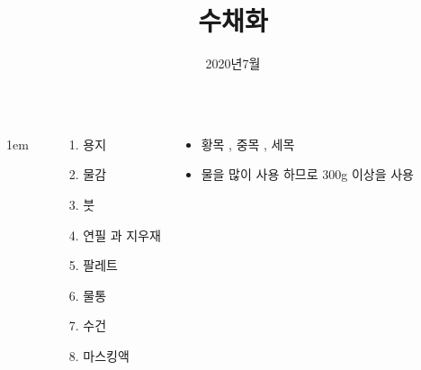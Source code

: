 \documentclass[	20pt, 
							a0paper, 
							landscape, %
							margin=0mm, %
							innermargin=4mm,  		%
							blockverticalspace=4mm, %
							colspace=5mm, 
							subcolspace=0mm
							]{tikzposter}
\title{ 수채화 }
\author{ 2020년7월 }
\begin{document}
	\maketitle[
					width=841mm,
					linewidth = 2mm,
					innersep=4mm,
					titletextscale =4, 
				]




	\begin{columns}


			{
					\setlength{\leftmargini}{7em}
					\setlength{\labelsep} {1em}
				\begin{LARGE}
					\begin{itemize}
					\item [1.] 용지
					\item [2.] 물감
					\item [3.] 붓
					\item [4.] 연필 과 지우재
					\item [5.] 팔레트
					\item [6.] 물통
					\item [7.] 수건

					\item [8.] 마스킹액

					\end{itemize}
				\end{LARGE}
			}


		{
			\setlength{\leftmargini}{4em}			
			\setlength{\labelsep}{1em} %

			\begin{LARGE}
			\begin{itemize}
			\item 황목 , 중목 , 세목
			\item 물을 많이 사용 하므로 300g 이상을 사용
			\end{itemize}
			\end{LARGE}

}
\end{columns}
\end{document}
